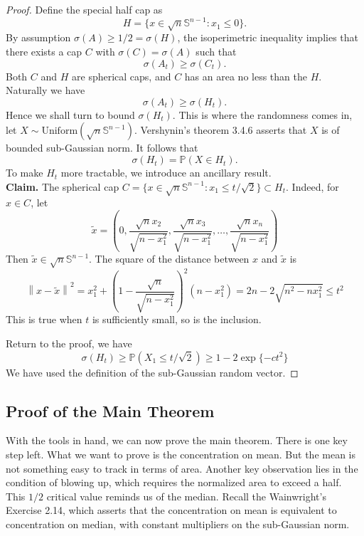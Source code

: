 \documentclass[9pt,onesided]{article}
\newcommand{\nm}[1]{\left\lVert#1\right\rVert}
\renewcommand{\ge}{\geqslant}
\renewcommand{\le}{\leqslant}
\newcommand{\s}{\mathbb{S}}
\newcommand{\p}{\mathbb{P}}
\theoremstyle{definition}
\begin{document}
\begin{proof}
    Define the special half cap as 
    \begin{equation*}
         H=\{ x\in \sqrt{n} \s^{n-1}:x_1\le 0\}.
    \end{equation*}
    By assumption $\sigma(A)\ge 1/2=\sigma(H)$, the isoperimetric inequality implies that there exists a cap $C$ with $\sigma(C)=\sigma(A)$ such that
    \[\sigma(A_t)\ge \sigma(C_t).\]
    Both $C$ and $H$ are spherical caps, and $C$ has an area no less than the $H$. Naturally we have
    $$ \sigma(A_t)\ge \sigma(H_t).$$
    Hence we shall turn to bound $\sigma(H_t)$. This is where the randomness comes in, let $X\sim \mathrm{Uniform}(\sqrt{n}\s^{n-1})$. Vershynin's theorem 3.4.6 asserts that $X$ is of bounded sub-Gaussian norm. It follows that
    \begin{equation*}
         \sigma(H_t)=\p(X\in H_t).
    \end{equation*}
    To make $H_t$ more tractable, we introduce an ancillary result.\\
    \textbf{Claim.} The spherical cap $C=\{x\in \sqrt{n}\s^{n-1}:x_1\le t/\sqrt{2}\}\subset H_t$. Indeed, for $x\in C$, let
    \begin{equation*}
        \tilde{x}=(0,\frac{\sqrt{n}x_2}{\sqrt{n-x_1^2}},\frac{\sqrt{n}x_3}{\sqrt{n-x_1^2}},\dots,\frac{\sqrt{n}x_n}{\sqrt{n-x_1^2}})
    \end{equation*}
    Then $\tilde{x}\in \sqrt{n}\s^{n-1}$. The square of the distance between $x$ and $\tilde{ x}$ is
    \begin{equation*}
        \nm{x-\tilde{x}}^2=x_1^2+(1-\frac{\sqrt{n}}{\sqrt{n-x_1^2}})^2 (n-x_1^2)=2n-2\sqrt{n^2-nx_1^2}\le t^2
    \end{equation*}
    This is true when $t$ is sufficiently small, so is the inclusion. 

     Return to the proof, we have
     $$\sigma(H_t)\ge \p(X_1\le t/\sqrt{2})\ge 1- 2\exp\{-ct^2\}$$
      We have used the definition of the sub-Gaussian random vector.
\end{proof}

\subsection{Proof of the Main Theorem}

With the tools in hand, we can now prove the main theorem. There is one key step left. What we want to prove is the concentration on mean. But the mean is not something easy to track in terms of area. Another key observation lies in the condition of blowing up, which requires the normalized area to exceed a half. This $1/2$ critical value reminds us of the median. Recall the Wainwright's Exercise 2.14, which asserts that the concentration on mean is equivalent to concentration on median, with constant multipliers on the sub-Gaussian norm. 
\end{document}
